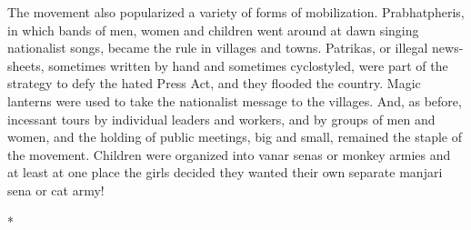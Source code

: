 \begin{multicols}{2}
The movement also popularized a variety of forms of mobilization. Prabhatpheris, in which bands of men, women and children went around at dawn singing nationalist songs, became the rule in villages and towns. Patrikas, or illegal news-sheets, sometimes written by hand and sometimes cyclostyled, were part of the strategy to defy the hated Press Act, and they flooded the country. Magic lanterns were used to take the nationalist message to the villages. And, as before, incessant tours by individual leaders and workers, and by groups of men and women, and the holding of public meetings, big and small, remained the staple of the movement. Children were organized into vanar senas or monkey armies and at least at one place the girls decided they wanted their own separate manjari sena or cat army!

\begin{center}*\end{center}


\end{multicols}
